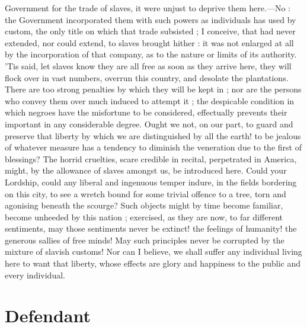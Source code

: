 \documentclass[a4paper]{article}
\begin{document}
Government for the trade of slaves, it were unjust to deprive them here.---No : the Government incorporated  them with such powers as individuals has used by custom, the only title on which that trade subsisted ; I conceive, that had never extended, nor could extend, to slaves brought hither : it was not enlarged at all by the incorporation of that company, as to the nature or limits of its authority. 'Tis said, let slaves know they are all free as soon as they arrive here, they will flock over in vast numbers, overrun this country, and desolate the plantations. There are too strong penalties by which they will be kept in ; nor are the persons who convey them over much induced to attempt it ; the despicable condition in which negroes have the misfortune to be considered, effectually prevents their important in any considerable degree. Ought we not, on our part, to guard and preserve that liberty by which we are distinguished by all the earth! to be jealous of whatever measure has a tendency to diminish the veneration due to the first of blessings? The horrid cruelties, scare credible in recital, perpetrated in America, might, by the allowance of slaves amongst us, be introduced here. Could your Lordship, could any liberal and ingenuous temper indure, in the fields bordering on this city, to see a wretch bound for some trivial offence to a tree, torn and agonising beneath the scourge? Such objects might by time become familiar, become unheeded by this nation ; exercised, as they are now, to far different sentiments, may those sentiments never be extinct! the feelings of humanity! the generous sallies of free minds! May such principles never be corrupted by the mixture of slavish customs! Nor can I believe, we shall suffer any individual living here to want that liberty, whose effects are glory and happiness to the public and every individual.

\section{Defendant}
\end{document}
